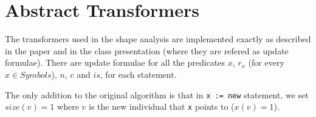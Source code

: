 \section*{Abstract Transformers}
The transformers used in the shape analysis are implemented exactly as described in the paper and in the class presentation (where they are refered as update formulae). There are update formulae for all the predicates $x$, $r_x$ (for every $x\in Symbols$), $n$, $c$ and $is$, for each statement.

The only addition to the original algorithm is that in \texttt{x := new} statement, we set $size(v) = 1$ where $v$ is the new individual that \texttt{x} points to ($x(v)=1$).
